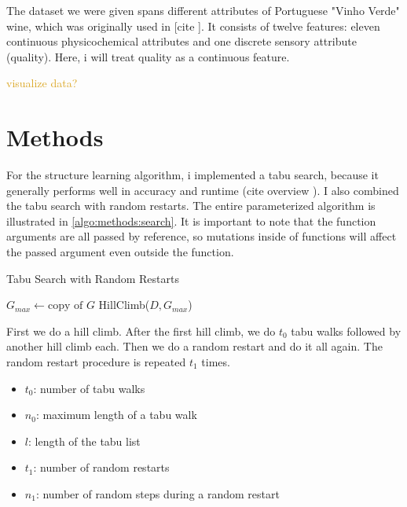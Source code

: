 \documentclass[sigconf, fleqn, prologue, dvipsnames]{acmart}
\newcommand{\maybe}[1]{%
	\textcolor{Goldenrod}{#1?}%
    \reversemarginpar%
    \marginpar{\raggedleft\textcolor{Goldenrod}{\rule{2mm}{2mm}}}%
}
\def\ndy{%
    \reversemarginpar%
    \marginpar{\raggedleft\textcolor{red}{\rule{2mm}{2mm}}}%
}
\begin{document}
The dataset we were given spans different attributes of Portuguese "Vinho Verde" wine, which was originally used in [cite\ndy].
It consists of twelve features: eleven continuous physicochemical attributes and one discrete sensory attribute (quality).
Here, i will treat quality as a continuous feature.

\maybe{visualize data}
\FloatBarrier


\section{Methods}
For the structure learning algorithm, i implemented a tabu search, because it generally performs well in accuracy and runtime (cite overview\ndy).
I also combined the tabu search with random restarts. The entire parameterized algorithm is illustrated in \autoref{algo:methods:search}.
It is important to note that the function arguments are all passed by reference, so mutations inside of functions will affect the passed argument even outside the function.

\begin{algorithm}
	\caption{Tabu Search with Random Restarts}
	\label{algo:methods:search}

	$G_{max} \gets \text{copy of } G$\;
	HillClimb($D, G_{max}$)\;
\end{algorithm}

First we do a hill climb. After the first hill climb, we do $t_0$ tabu walks followed by another hill climb each.
Then we do a random restart and do it all again. The random restart procedure is repeated $t_1$ times.
\begin{itemize}
	\item $t_0$: number of tabu walks
	\item $n_0$: maximum length of a tabu walk
	\item $l$: length of the tabu list
	\item $t_1$: number of random restarts
	\item $n_1$: number of random steps during a random restart
\end{itemize}

\FloatBarrier
\end{document}
